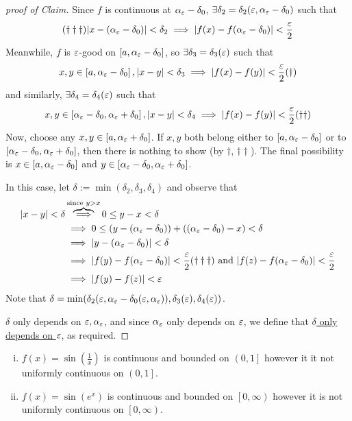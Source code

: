 \begin{proof}[proof of Claim]
    Since $f$ is continuous at $\alpha_\varepsilon - \delta_0$, $\exists \delta_2 = \delta_2(\varepsilon, \alpha_\varepsilon - \delta_0)$ such that
    $$(\dagger\dagger\dagger) |x-(\alpha_\varepsilon - \delta_0)| < \delta_2 \implies |f(x) - f(\alpha_\varepsilon-\delta_0)| < \frac{\varepsilon}{2}$$
    Meanwhile, $f$ is $\varepsilon$-good on $\left[a, \alpha_\varepsilon - \delta_0\right]$, so $\exists \delta_3 = \delta_3(\varepsilon)$ such that
    $$x, y \in \left[a, \alpha_\varepsilon - \delta_0\right], |x-y| < \delta_3 \implies |f(x) - f(y)| < \frac{\varepsilon}{2} (\dagger)$$
    and similarly, $\exists \delta_4 = \delta_4(\varepsilon)$ such that
    $$x, y \in \left[\alpha_\varepsilon - \delta_0, \alpha_\varepsilon + \delta_0\right], |x-y| < \delta_4 \implies |f(x) - f(y)| < \frac{\varepsilon}{2} (\dagger\dagger)$$
    Now, choose any $x, y \in \left[a, \alpha_\varepsilon + \delta_0\right]$.
    If $x, y$ both belong either to $\left[a, \alpha_\varepsilon - \delta_0\right]$ or to$\left[\alpha_\varepsilon - \delta_0, \alpha_\varepsilon + \delta_0\right]$, then there is 
    nothing to show (by $\dagger$, $\dagger\dagger$). The final possibility is $x\in \left[a, \alpha_\varepsilon - \delta_0\right]$ and $y \in \left[\alpha_\varepsilon - \delta_0, \alpha_\varepsilon + \delta_0\right]$.

    In this case, let $\delta := \min(\delta_2, \delta_3, \delta_4)$ and observe that
    \begin{align*}
        |x-y| < \delta &\overbrace{\implies}^{\text{since } y > x} 0 \leq y-x<\delta \\
        &\implies 0 \leq (y - (\alpha_\varepsilon - \delta_0)) + ((\alpha_\varepsilon - \delta_0) - x) < \delta \\
        &\implies |y - (\alpha_\varepsilon - \delta_0)| < \delta \\
        &\implies |f(y) - f(\alpha_\varepsilon - \delta_0)| < \frac{\varepsilon}{2} (\dagger\dagger\dagger) \text{ and } |f(z) - f(\alpha_\varepsilon - \delta_0)| < \frac{\varepsilon}{2} \\
        &\implies |f(y) - f(z)| < \varepsilon
    \end{align*}
    Note that $\delta = \min(\delta_2(\varepsilon, \alpha_\varepsilon - \delta_0(\varepsilon, \alpha_\varepsilon)), \delta_3(\varepsilon), \delta_4(\varepsilon))$.

    $\delta$ only depends on $\varepsilon, \alpha_\varepsilon$, and since $\alpha_\varepsilon$ only depends on $\varepsilon$, we define that \underline{$\delta$ only depends on $\varepsilon$}, as required.
\end{proof}

\begin{example}
    \text{ }
    \begin{enumerate}[(i)]
        \item $f(x) = \sin\left(\frac{1}{x}\right)$ is continuous and bounded on $\left(0, 1\right]$ however it it not uniformly continuous on $\left(0, 1\right]$.
        \item $f(x) = \sin\left(e^x\right)$ is continuous and bounded on $\left[0, \infty\right)$ however it is not uniformly continuous on $\left[0, \infty\right)$. 
    \end{enumerate}
\end{example}

